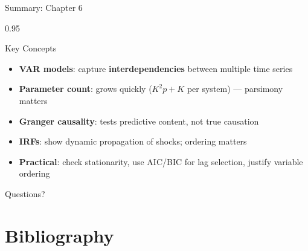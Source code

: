 \documentclass[9pt, aspectratio=169, t]{beamer}
\begin{document}
\begin{frame}{Summary: Chapter 6}
    \begin{cminipage}{0.95\textwidth}
    \begin{exampleblock}{Key Concepts}
        \begin{itemize}\setlength{\itemsep}{2pt}
            \item[\textcolor{MainBlue}{\textbf{1.}}] \textbf{VAR models}: capture \textbf{interdependencies} between multiple time series
            \item[\textcolor{MainBlue}{\textbf{2.}}] \textbf{Parameter count}: grows quickly ($K^2 p + K$ per system) --- parsimony matters
            \item[\textcolor{MainBlue}{\textbf{3.}}] \textbf{Granger causality}: tests predictive content, not true causation
            \item[\textcolor{MainBlue}{\textbf{4.}}] \textbf{IRFs}: show dynamic propagation of shocks; ordering matters
            \item[\textcolor{MainBlue}{\textbf{5.}}] \textbf{Practical}: check stationarity, use AIC/BIC for lag selection, justify variable ordering
        \end{itemize}
    \end{exampleblock}

    \vspace{0.5cm}
    \begin{center}
        \Large\textcolor{MainBlue}{Questions?}
    \end{center}
    \end{cminipage}
\end{frame}

\section{Bibliography}
\end{document}

